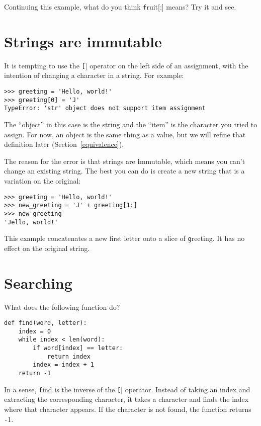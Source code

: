 \documentclass[
DIV=11,
fontsize=12,
twoside,
headinclude=false,
titlepage=firstiscover,
abstract=true,
headsepline=true,
footsepline=true,
chapterprefix=true, %
headings=big,
bibliography=totoc,%
captions=tableheading
]{scrbook}
\theoremstyle{definition}
\begin{document}
Continuing this example, what do you think 
{\texttt fruit[:]} means?  Try it and see.



\section{Strings are immutable}

It is tempting to use the {\texttt []} operator on the left side of an
assignment, with the intention of changing a character in a string.
For example:

\begin{lstlisting}
>>> greeting = 'Hello, world!'
>>> greeting[0] = 'J'
TypeError: 'str' object does not support item assignment
\end{lstlisting}
%
The ``object'' in this case is the string and the ``item'' is
the character you tried to assign.  For now, an object is
the same thing as a value, but we will refine that definition
later (Section~\ref{equivalence}).  

The reason for the error is that
strings are {\textbf immutable}, which means you can't change an
existing string.  The best you can do is create a new string
that is a variation on the original:

\begin{lstlisting}
>>> greeting = 'Hello, world!'
>>> new_greeting = 'J' + greeting[1:]
>>> new_greeting
'Jello, world!'
\end{lstlisting}
%
This example concatenates a new first letter onto
a slice of {\texttt greeting}.  It has no effect on
the original string.


\section{Searching}
\label{find}

What does the following function do?

\begin{lstlisting}
def find(word, letter):
    index = 0
    while index < len(word):
        if word[index] == letter:
            return index
        index = index + 1
    return -1
\end{lstlisting}
%
In a sense, {\texttt find} is the inverse of the {\texttt []} operator.
Instead of taking an index and extracting the corresponding character,
it takes a character and finds the index where that character
appears.  If the character is not found, the function returns {\texttt
-1}.
\end{document}
